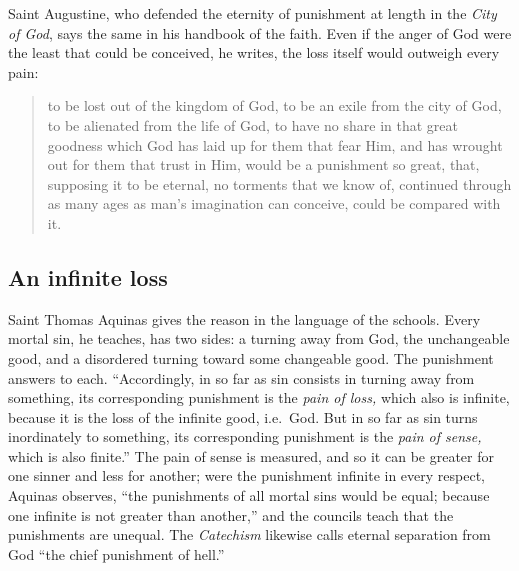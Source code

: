 Saint Augustine, who defended the eternity of punishment at length in the \emph{City of God}, says the same in his handbook of the faith. Even if the anger of God were the least that could be conceived, he writes, the loss itself would outweigh every pain:

\begin{quote}
to be lost out of the kingdom of God, to be an exile from the city of God, to be alienated from the life of God, to have no share in that great goodness which God has laid up for them that fear Him, and has wrought out for them that trust in Him, would be a punishment so great, that, supposing it to be eternal, no torments that we know of, continued through as many ages as man's imagination can conceive, could be compared with it.
\end{quote}

\subsection{An infinite loss}

Saint Thomas Aquinas gives the reason in the language of the schools. Every mortal sin, he teaches, has two sides: a turning away from God, the unchangeable good, and a disordered turning toward some changeable good. The punishment answers to each. ``Accordingly, in so far as sin consists in turning away from something, its corresponding punishment is the \emph{pain of loss,} which also is infinite, because it is the loss of the infinite good, i.e.\ God. But in so far as sin turns inordinately to something, its corresponding punishment is the \emph{pain of sense,} which is also finite.'' The pain of sense is measured, and so it can be greater for one sinner and less for another; were the punishment infinite in every respect, Aquinas observes, ``the punishments of all mortal sins would be equal; because one infinite is not greater than another,'' and the councils teach that the punishments are unequal. The \emph{Catechism} likewise calls eternal separation from God ``the chief punishment of hell.''

